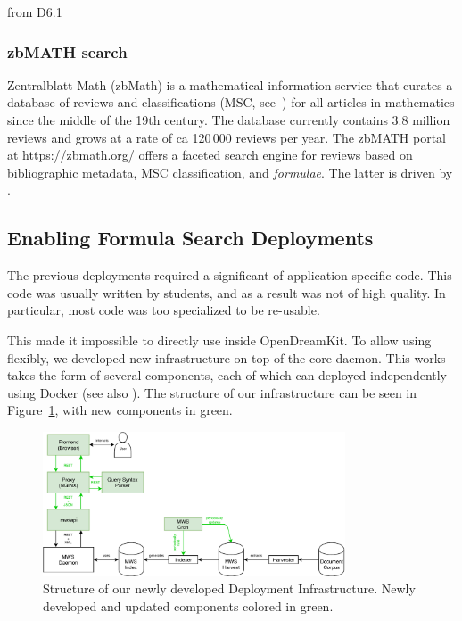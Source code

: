 \begin{newpart}{from D6.1}
\subsubsection{zbMATH search}

Zentralblatt Math (zbMath) is a mathematical information service that curates a database of reviews and classifications (MSC, see~\cite{MSC2010}) for all articles in mathematics since the middle of the 19th century. The database currently contains 3.8 million reviews and grows at a rate of ca 120\,000 reviews per year.
The zbMATH portal at \url{https://zbmath.org/} offers a faceted search engine for reviews based on bibliographic metadata, MSC classification, and \emph{formulae}.
The latter is driven by \MWS. 

\end{newpart}

\subsection{Enabling Formula Search Deployments}\label{sec:software:deployment}

The previous \MWS deployments required a significant of application-specific code. 
This code was usually written by students, and as a result was not of high quality. 
In particular, most code was too specialized to be re-usable. 

This made it impossible to directly use \MWS inside OpenDreamKit. 
To allow using \MWS flexibly, we developed new infrastructure on top of the core \MWS daemon. 
This works takes the form of several components, each of which can deployed independently using Docker  (see also ).
The structure of our infrastructure can be seen in Figure~\ref{fig:mwsdeployment}, with new components in green. 

\begin{figure}[ht]
  \includegraphics[width=0.8\textwidth]{mws_layout.pdf}
  \caption{Structure of our newly developed \MWS Deployment Infrastructure. Newly developed and updated components colored in green. }\label{fig:mwsdeployment}
\end{figure}

